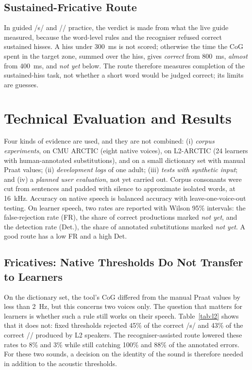 \documentclass[engproc,article,submit,moreauthors]{Definitions/mdpi}
\newcommand{\ipa}[1]{/#1/}
\begin{document}
\subsection{Sustained-Fricative Route}
In guided \ipa{s} and \ipa{\textesh} practice, the verdict is made from what the live guide measured, because the word-level rules and the recogniser refused correct sustained hisses. A hiss under 300~ms is not scored; otherwise the time the CoG spent in the target zone, summed over the hiss, gives \textit{correct} from 800~ms, \textit{almost} from 400~ms, and \textit{not yet} below. The route therefore measures completion of the sustained-hiss task, not whether a short word would be judged correct; its limits are guesses.

\section{Technical Evaluation and Results}
Four kinds of evidence are used, and they are not combined: (i) \emph{corpus experiments}, on CMU ARCTIC \cite{kominek2004} (eight native voices), on L2-ARCTIC \cite{zhao2018} (24 learners with human-annotated substitutions), and on a small dictionary set with manual Praat values; (ii) \emph{development logs} of one adult; (iii) \emph{tests with synthetic input}; and (iv) a \emph{planned user evaluation}, not yet carried out. Corpus consonants were cut from sentences and padded with silence to approximate isolated words, at 16~kHz. Accuracy on native speech is balanced accuracy with leave-one-voice-out testing. On learner speech, two rates are reported with Wilson 95\% intervals: the false-rejection rate (FR), the share of correct productions marked \textit{not yet}, and the detection rate (Det.), the share of annotated substitutions marked \textit{not yet}. A good route has a low FR and a high Det.

\subsection{Fricatives: Native Thresholds Do Not Transfer to Learners}
On the dictionary set, the tool's CoG differed from the manual Praat values by less than 2~Hz, but this concerns two voices only. The question that matters for learners is whether such a rule still works on their speech. Table~\ref{tab:l2} shows that it does not: fixed thresholds rejected 45\% of the correct \ipa{s} and 43\% of the correct \ipa{\textesh} produced by L2 speakers. The recogniser-assisted route lowered these rates to 8\% and 3\% while still catching 100\% and 88\% of the annotated errors. For these two sounds, a decision on the identity of the sound is therefore needed in addition to the acoustic thresholds.
\end{document}
